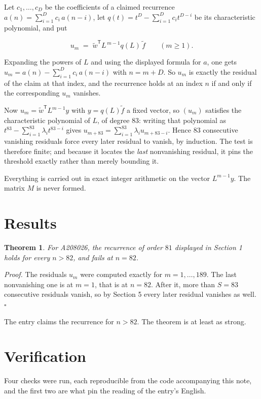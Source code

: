 \documentclass[11pt]{article}
\newtheorem{theorem}{Theorem}
\theoremstyle{definition}
\begin{document}
Let $c_1,\dots,c_D$ be the coefficients of a claimed recurrence $a(n) = \sum_{i=1}^{D} c_i\,a(n-i)$, let $q(t) = t^{D} - \sum_{i=1}^{D} c_i t^{D-i}$ be its characteristic polynomial, and put

\[u_m \;=\; \tilde w^{\mathsf T} L^{\,m-1} q(L)\,\tilde f \qquad (m \ge 1).\]

Expanding the powers of $L$ and using the displayed formula for $a$, one gets $u_m = a(n) - \sum_{i=1}^{D} c_i\,a(n-i)$ with $n = m + D$. So $u_m$ is exactly the residual of the claim at that index, and the recurrence holds at an index $n$ if and only if the corresponding $u_m$ vanishes.

Now $u_m = \tilde w^{\mathsf T} L^{m-1} y$ with $y = q(L)\tilde f$ a fixed vector, so $(u_m)$ satisfies the characteristic polynomial of $L$, of degree $83$: writing that polynomial as $t^{83} - \sum_{i=1}^{83} \lambda_i t^{83-i}$ gives $u_{m+83} = \sum_{i=1}^{83} \lambda_i u_{m+83-i}$. Hence $83$ consecutive vanishing residuals force every later residual to vanish, by induction. The test is therefore finite; and because it locates the {\itshape last} nonvanishing residual, it pins the threshold exactly rather than merely bounding it.

Everything is carried out in exact integer arithmetic on the vector $L^{m-1}y$. The matrix $M$ is never formed.

\section{Results}

\begin{theorem} For A208026, the recurrence of order $81$ displayed in Section 1 holds for every $n > 82$, and fails at $n = 82$.\end{theorem}

{\itshape Proof.} The residuals $u_m$ were computed exactly for $m = 1,\dots,189$. The last nonvanishing one is at $m = 1$, that is at $n = 82$. After it, more than $S = 83$ consecutive residuals vanish, so by Section 5 every later residual vanishes as well. $\square$

The entry claims the recurrence for $n > 82$. The theorem is at least as strong.

\section{Verification}

Four checks were run, each reproducible from the code accompanying this note, and the first two are what pin the reading of the entry's English.
\end{document}
